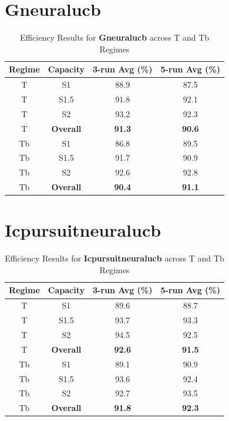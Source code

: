 \documentclass[11pt]{article}
\begin{document}
\section*{Gneuralucb}
\begin{table}[H]
\centering
\caption{Efficiency Results for \textbf{Gneuralucb} across T and Tb Regimes}
\begin{tabular}{|c|c|c|c|}
\hline
Regime & Capacity & 3-run Avg (\%) & 5-run Avg (\%) \\ \hline
T & S1 & 88.9 & 87.5 \\ \hline
T & S1.5 & 91.8 & 92.1 \\ \hline
T & S2 & 93.2 & 92.3 \\ \hline
T & \textbf{Overall} & \textbf{91.3} & \textbf{90.6} \\ \hline
Tb & S1 & 86.8 & 89.5 \\ \hline
Tb & S1.5 & 91.7 & 90.9 \\ \hline
Tb & S2 & 92.6 & 92.8 \\ \hline
Tb & \textbf{Overall} & \textbf{90.4} & \textbf{91.1} \\ \hline
\end{tabular}
\end{table}

\section*{Icpursuitneuralucb}
\begin{table}[H]
\centering
\caption{Efficiency Results for \textbf{Icpursuitneuralucb} across T and Tb Regimes}
\begin{tabular}{|c|c|c|c|}
\hline
Regime & Capacity & 3-run Avg (\%) & 5-run Avg (\%) \\ \hline
T & S1 & 89.6 & 88.7 \\ \hline
T & S1.5 & 93.7 & 93.3 \\ \hline
T & S2 & 94.5 & 92.5 \\ \hline
T & \textbf{Overall} & \textbf{92.6} & \textbf{91.5} \\ \hline
Tb & S1 & 89.1 & 90.9 \\ \hline
Tb & S1.5 & 93.6 & 92.4 \\ \hline
Tb & S2 & 92.7 & 93.5 \\ \hline
Tb & \textbf{Overall} & \textbf{91.8} & \textbf{92.3} \\ \hline
\end{tabular}
\end{table}
\end{document}
